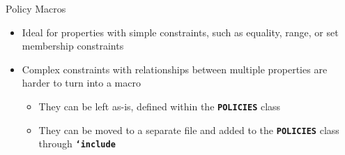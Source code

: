 \documentclass[aspectratio=169]{beamer}
\newcommand{\code}[1]{
  \textbf{\texttt{#1}}
}
\begin{document}
\begin{frame}{Policy Macros}
\begin{itemize}
  \item Ideal for properties with simple constraints, such as equality, range, or set membership constraints
  \vspace{8pt}
  \item Complex constraints with relationships between multiple properties are harder to turn into a macro
  \begin{itemize}
    \vspace{8pt}
    \item They can be left as-is, defined within the \code{POLICIES} class
    \vspace{8pt}
    \item They can be moved to a separate file and added to the \code{POLICIES} class through \code{`include}
  \end{itemize}
\end{itemize}
\end{frame}

\begin{frame}
\end{frame}
\end{document}
